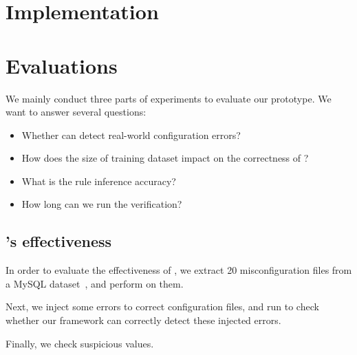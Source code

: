 
\section{Implementation}


\section{Evaluations}
\label{sec-eval}

We mainly conduct three parts of experiments to evaluate our \app
prototype. We want to answer several questions:

\begin{itemize}

\item Whether \app can detect real-world configuration errors?

\item How does the size of training dataset impact on the correctness
  of \app?

\item What is the rule inference accuracy?

\item How long can we run the verification?

\end{itemize}



\subsection{\app's effectiveness}

In order to evaluate the effectiveness of \app, we extract
20 misconfiguration files from a MySQL dataset~\cite{xu15hey},
and perform \app on them. 

Next, we inject some errors to correct configuration files,
and run \app to check whether our framework can correctly detect
these injected errors. 

Finally, we check suspicious values.

